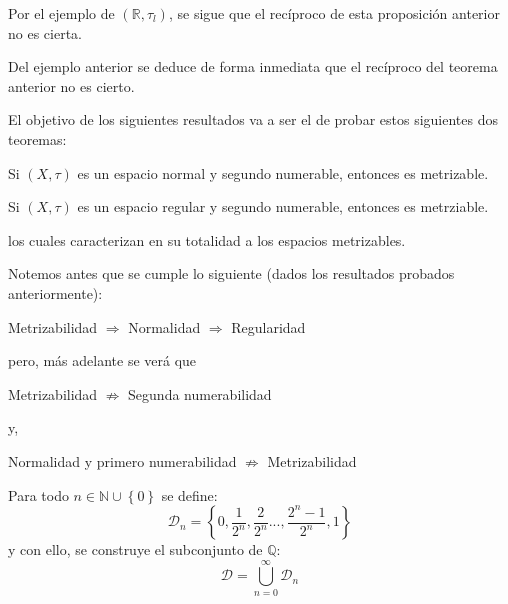 \documentclass[12pt]{report}
\theoremstyle{largebreak}
\begin{document}
    \begin{obs}
        Por el ejemplo de $(\mathbb{R},\tau_l)$, se sigue que el recíproco de esta proposición anterior no es cierta.
    \end{obs}

    \begin{obs}
        Del ejemplo anterior se deduce de forma inmediata que el recíproco del teorema anterior no es cierto.
    \end{obs}

    El objetivo de los siguientes resultados va a ser el de probar estos siguientes dos teoremas:

    \begin{theor}
        Si $(X,\tau)$ es un espacio normal y segundo numerable, entonces es metrizable.
    \end{theor}

    \begin{theor}
        Si $(X,\tau)$ es un espacio regular y segundo numerable, entonces es metrziable.
    \end{theor}

    los cuales caracterizan en su totalidad a los espacios metrizables.

    Notemos antes que se cumple lo siguiente (dados los resultados probados anteriormente):
    \begin{center}
        Metrizabilidad $\Rightarrow$ Normalidad $\Rightarrow$ Regularidad
    \end{center}
    pero, más adelante se verá que
    \begin{center}
        Metrizabilidad $\nRightarrow$ Segunda numerabilidad
    \end{center}
    y,
    \begin{center}
        Normalidad y primero numerabilidad $\nRightarrow$ Metrizabilidad
    \end{center}

    \begin{mydef}
        Para todo $n\in\mathbb{N}\cup\left\{0\right\}$ se define:
        \begin{equation*}
            \mathcal{D}_n=\left\{0,\frac{1}{2^n},\frac{2}{2^{n}}...,\frac{2^n-1}{2^n},1\right\}
        \end{equation*}
        y con ello, se construye el subconjunto de $\mathbb{Q}$:
        \begin{equation*}
            \mathcal{D}=\bigcup_{ n=0}^\infty\mathcal{D}_n
        \end{equation*}
    \end{mydef}
\end{document}

